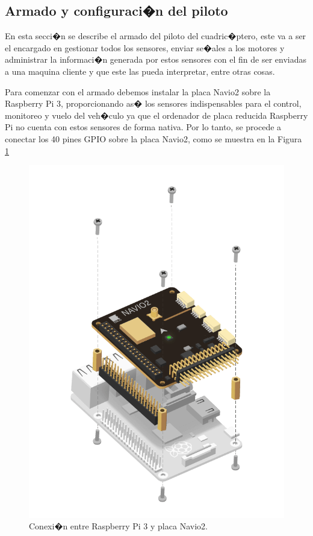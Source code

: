 	\subsection{Armado y configuraci�n del piloto}
		En esta secci�n se describe el armado del piloto del cuadric�ptero, este va a ser el encargado en gestionar todos los sensores, enviar se�ales a los motores y administrar la informaci�n generada por estos sensores con el fin de ser enviadas a una maquina cliente y que este las pueda interpretar, entre otras cosas.
		
		
		\par Para comenzar con el armado debemos instalar la placa Navio2 sobre la Raspberry Pi 3, proporcionando as� los sensores indispensables para el control, monitoreo y vuelo del veh�culo ya que el ordenador de placa reducida Raspberry Pi no cuenta con estos sensores de forma nativa. Por lo tanto, se procede a conectar los 40 pines GPIO sobre la placa Navio2, como se muestra en la Figura \ref{fig:navio2-mount}
		
		
		\begin{figure}[h!]
			\centering
			\includegraphics[width=0.4\linewidth, height=0.25\textheight]{Imagenes/navio2-mount}
			\caption{Conexi�n entre Raspberry Pi 3 y placa Navio2.}
			\label{fig:navio2-mount}
		\end{figure}
		
